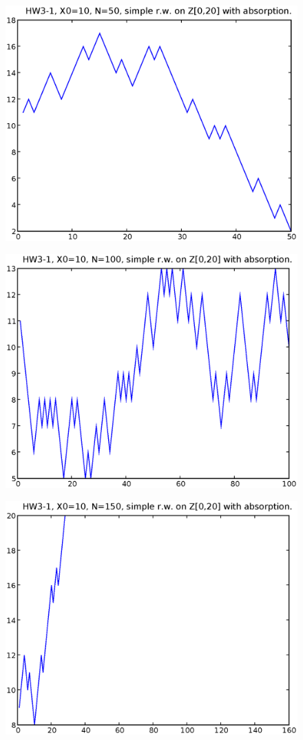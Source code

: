 \documentclass[a4paper,10pt]{article}
\begin{document}
\begin{figure}
\includegraphics[width=1\textwidth]{hw3_1_b_N50_X0_10.eps}
\caption{}
\end{figure}

\begin{figure}
\includegraphics[width=1\textwidth]{hw3_1_b_N100_X0_10.eps}
\caption{}
\end{figure}

\begin{figure}
\includegraphics[width=1\textwidth]{hw3_1_b_N150_X0_10.eps}
\caption{}
\end{figure}
\end{document}
